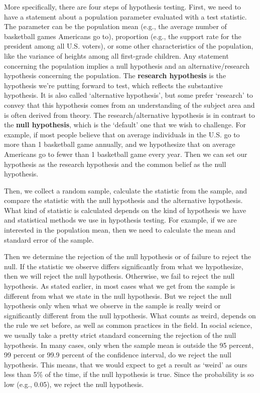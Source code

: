 \documentclass{book}
\begin{document}
More specifically, there are four steps of hypothesis testing. First, we need
to have a statement about a population parameter evaluated with a test
statistic. The parameter can be the population mean (e.g., the average number
of basketball games Americans go to), proportion (e.g., the support rate for
the president among all U.S. voters), or some other characteristics of the
population, like the variance of heights among all first-grade children. Any
statement concerning the population implies a null hypothesis and an
alternative/research hypothesis concerning the population. The
\textbf{research hypothesis} is the hypothesis we're putting forward to test,
which reflects the substantive hypothesis. It is also called `alternative
hypothesis', but some prefer `research' to convey that this hypothesis comes
from an understanding of the subject area and is often derived from theory.
The research/alternative hypothesis is in contrast to the \textbf{null
hypothesis}, which is the `default' one that we wish to challenge. For
example, if most people believe that on average individuals in the U.S. go to
more than 1 basketball game annually, and we hypothesize that on average
Americans go to fewer than 1 basketball game every year. Then we can set our
hypothesis as the research hypothesis and the common belief as the null
hypothesis.

Then, we collect a random sample, calculate the statistic from the sample, and
compare the statistic with the null hypothesis and the alternative hypothesis.
What kind of statistic is calculated depends on the kind of hypothesis we have
and statistical methods we use in hypothesis testing. For example, if we are
interested in the population mean, then we need to calculate the mean and
standard error of the sample.

Then we determine the rejection of the null hypothesis or of failure to reject
the null. If the statistic we observe differs significantly from what we
hypothesize, then we will reject the null hypothesis. Otherwise, we fail to
reject the null hypothesis. As stated earlier, in most cases what we get from
the sample is different from what we state in the null hypothesis. But we
reject the null hypothesis only when what we observe in the sample is really
weird or significantly different from the null hypothesis. What counts as
weird, depends on the rule we set before, as well as common practices in the
field. In social science, we usually take a pretty strict standard concerning
the rejection of the null hypothesis. In many cases, only when the sample mean
is outside the 95 percent, 99 percent or 99.9 percent of the confidence
interval, do we reject the null hypothesis. This means, that we would expect
to get a result as `weird' as ours less than 5\% of the time, if the null
hypothesis is true. Since the probability is so low (e.g., 0.05), we reject
the null hypothesis.
\end{document}

